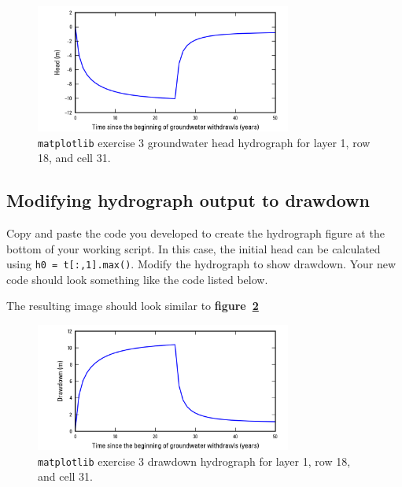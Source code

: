 \documentclass[12pt]{article}
\begin{document}
\begin{figure}
	\centering
  	\includegraphics[width=0.75\textwidth]{../figures.MF/Cell_711.png}
 	\caption{\texttt{matplotlib} exercise 3 groundwater head hydrograph for layer 1, row 18, and cell 31.}
	\label{FigEx3HeadHydrograph}
\end{figure}

\subsection{Modifying hydrograph output to drawdown}
Copy and paste the code you developed to create the hydrograph figure at the bottom of your working script. In this case, the initial head can be calculated using \texttt{h0 = t[:,1].max()}. Modify the hydrograph to show drawdown. Your new code should look something like the code listed below.

\begin{center}
	
\end{center}

The resulting image should look similar to \textbf{figure~\ref{FigEx3DrawdownHydrograph}}

\begin{figure}
	\centering
  	\includegraphics[width=0.75\textwidth]{../figures.MF/Cell_711_drawdown.png}
 	\caption{\texttt{matplotlib} exercise 3 drawdown hydrograph for layer 1, row 18, and cell 31.}
	\label{FigEx3DrawdownHydrograph}
\end{figure}
\end{document}
